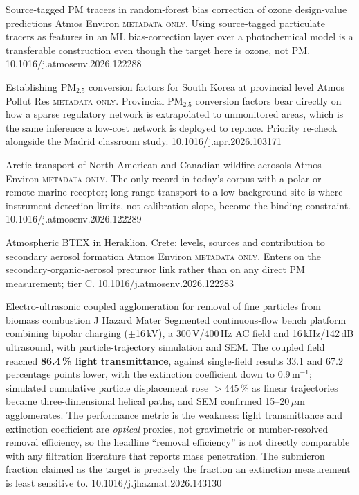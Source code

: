 \documentclass[10pt]{article}
\begin{document}
{Source-tagged PM tracers in random-forest bias correction of ozone design-value predictions}
{Atmos Environ}
{\textsc{metadata only}. Using source-tagged particulate tracers as features in an ML
bias-correction layer over a photochemical model is a transferable construction even
though the target here is ozone, not PM.}
{10.1016/j.atmosenv.2026.122288}


{Establishing PM$_{2.5}$ conversion factors for South Korea at provincial level}
{Atmos Pollut Res}
{\textsc{metadata only}. Provincial PM$_{2.5}$ conversion factors bear directly on how a
sparse regulatory network is extrapolated to unmonitored areas, which is the same
inference a low-cost network is deployed to replace. Priority re-check alongside the
Madrid classroom study.}
{10.1016/j.apr.2026.103171}

{Arctic transport of North American and Canadian wildfire aerosols}
{Atmos Environ}
{\textsc{metadata only}. The only record in today's corpus with a polar or remote-marine
receptor; long-range transport to a low-background site is where instrument detection
limits, not calibration slope, become the binding constraint.}
{10.1016/j.atmosenv.2026.122289}

{Atmospheric BTEX in Heraklion, Crete: levels, sources and contribution to secondary aerosol formation}
{Atmos Environ}
{\textsc{metadata only}. Enters on the secondary-organic-aerosol precursor link rather
than on any direct PM measurement; tier C.}
{10.1016/j.atmosenv.2026.122283}


{Electro-ultrasonic coupled agglomeration for removal of fine particles from biomass combustion}
{J Hazard Mater}
{Segmented continuous-flow bench platform combining bipolar charging ($\pm$16\,kV), a
300\,V/400\,Hz AC field and 16\,kHz/142\,dB ultrasound, with particle-trajectory
simulation and SEM. The coupled field reached \textbf{86.4\,\% light transmittance},
against single-field results 33.1 and 67.2 percentage points lower, with the extinction
coefficient down to 0.9\,m$^{-1}$; simulated cumulative particle displacement rose
$>$445\,\% as linear trajectories became three-dimensional helical paths, and SEM
confirmed 15--20\,$\mu$m agglomerates. The performance metric is the weakness: light
transmittance and extinction coefficient are \emph{optical} proxies, not gravimetric or
number-resolved removal efficiency, so the headline ``removal efficiency'' is not
directly comparable with any filtration literature that reports mass penetration. The
submicron fraction claimed as the target is precisely the fraction an extinction
measurement is least sensitive to.}
{10.1016/j.jhazmat.2026.143130}
\end{document}
